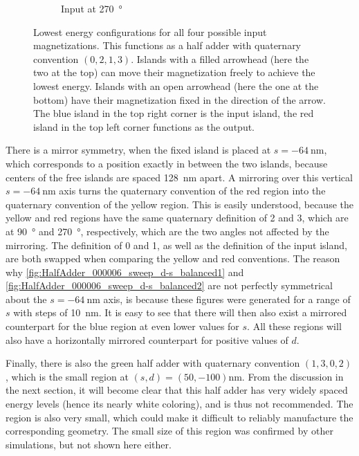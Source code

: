 \documentclass[11pt,a4paper,english]{article}
\begin{document}
\begin{figure}
\begin{subfigure}[t]{0.23\textwidth}
    \caption{Input at \SI{270}{\degree}}
\end{subfigure}
\caption{Lowest energy configurations for all four possible input magnetizations. This functions as a half adder with quaternary convention $(0,2,1,3)$. Islands with a filled arrowhead (here the two at the top) can move their magnetization freely to achieve the lowest energy. Islands with an open arrowhead (here the one at the bottom) have their magnetization fixed in the direction of the arrow. The blue island in the top right corner is the input island, the red island in the top left corner functions as the output.}
\label{fig:HalfAdder_000006_configurations_In2_0213}
\end{figure}


There is a mirror symmetry, when the fixed island is placed at $s=\SI{-64}{\nano\metre}$, which corresponds to a position exactly in between the two islands, because centers of the free islands are spaced \SI{128}{\nano\metre} apart. A mirroring over this vertical $s=\SI{-64}{\nano\metre}$ axis turns the quaternary convention of the red region into the quaternary convention of the yellow region. This is easily understood, because the yellow and red regions have the same quaternary definition of 2 and 3, which are at \SI{90}{\degree} and \SI{270}{\degree}, respectively, which are the two angles not affected by the mirroring. The definition of 0 and 1, as well as the definition of the input island, are both swapped when comparing the yellow and red conventions. The reason why \cref{fig:HalfAdder_000006_sweep_d-s_balanced1} and \cref{fig:HalfAdder_000006_sweep_d-s_balanced2} are not perfectly symmetrical about the $s=\SI{-64}{\nano\metre}$ axis, is because these figures were generated for a range of $s$ with steps of \SI{10}{\nano\metre}. It is easy to see that there will then also exist a mirrored counterpart for the blue region at even lower values for $s$. All these regions will also have a horizontally mirrored counterpart for positive values of $d$.

Finally, there is also the green half adder with quaternary convention $(1,3,0,2)$, which is the small region at $(s,d) = (50, -100) \si{\nano\metre}$. From the discussion in the next section, it will become clear that this half adder has very widely spaced energy levels (hence its nearly white coloring), and is thus not recommended. The region is also very small, which could make it difficult to reliably manufacture the corresponding geometry. The small size of this region was confirmed by other simulations, but not shown here either.
\end{document}
